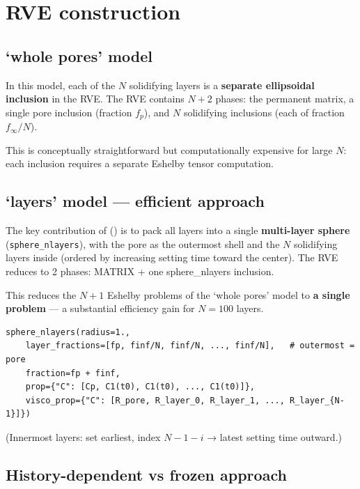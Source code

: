 \documentclass[
  a4paper,
  numbers=noendperiod,
  DIV=12]{scrreprt}
\begin{document}
\section{RVE construction}\label{sec-ageing-rve-construction}

\subsection{`whole pores' model}\label{sec-whole-pores}

In this model, each of the \(N\) solidifying layers is a
\textbf{separate ellipsoidal inclusion} in the RVE. The RVE contains
\(N + 2\) phases: the permanent matrix, a single pore inclusion
(fraction \(f_p\)), and \(N\) solidifying inclusions (each of fraction
\(f_\infty/N\)).

This is conceptually straightforward but computationally expensive for
large \(N\): each inclusion requires a separate Eshelby tensor
computation.

\subsection{`layers' model --- efficient
approach}\label{sec-layers-model}

The key contribution of () is to pack all layers into a single \textbf{multi-layer sphere}
(\texttt{sphere\_nlayers}), with the pore as the outermost shell and the
\(N\) solidifying layers inside (ordered by increasing setting time
toward the center). The RVE reduces to 2 phases: MATRIX + one
sphere\_nlayers inclusion.

This reduces the \(N+1\) Eshelby problems of the `whole pores' model to
\textbf{a single problem} --- a substantial efficiency gain for
\(N = 100\) layers.

\begin{verbatim}
sphere_nlayers(radius=1.,
    layer_fractions=[fp, finf/N, finf/N, ..., finf/N],   # outermost = pore
    fraction=fp + finf,
    prop={"C": [Cp, C1(t0), C1(t0), ..., C1(t0)]},
    visco_prop={"C": [R_pore, R_layer_0, R_layer_1, ..., R_layer_{N-1}]})
\end{verbatim}

(Innermost layers: set earliest, index \(N-1-i\) → latest setting time
outward.)

\subsection{History-dependent vs frozen approach}\label{sec-history}
\end{document}
